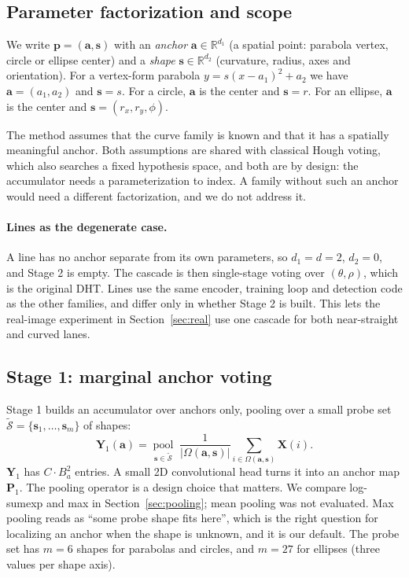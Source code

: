 \documentclass[11pt]{article}
\begin{document}
\subsection{Parameter factorization and scope}
We write $\mathbf{p}=(\mathbf{a},\mathbf{s})$ with an \emph{anchor} $\mathbf{a}\in\mathbb{R}^{d_1}$ (a spatial point: parabola vertex, circle or ellipse center) and a \emph{shape} $\mathbf{s}\in\mathbb{R}^{d_2}$ (curvature, radius, axes and orientation). For a vertex-form parabola $y=s(x-a_1)^2+a_2$ we have $\mathbf{a}=(a_1,a_2)$ and $\mathbf{s}=s$. For a circle, $\mathbf{a}$ is the center and $\mathbf{s}=r$. For an ellipse, $\mathbf{a}$ is the center and $\mathbf{s}=(r_x,r_y,\phi)$.

The method assumes that the curve family is known and that it has a spatially meaningful anchor. Both assumptions are shared with classical Hough voting, which also searches a fixed hypothesis space, and both are by design: the accumulator needs a parameterization to index. A family without such an anchor would need a different factorization, and we do not address it.

\paragraph{Lines as the degenerate case.} A line has no anchor separate from its own parameters, so $d_1=d=2$, $d_2=0$, and Stage 2 is empty. The cascade is then single-stage voting over $(\theta,\rho)$, which is the original DHT. Lines use the same encoder, training loop and detection code as the other families, and differ only in whether Stage 2 is built. This lets the real-image experiment in Section~\ref{sec:real} use one cascade for both near-straight and curved lanes.

\subsection{Stage 1: marginal anchor voting}
Stage 1 builds an accumulator over anchors only, pooling over a small probe set $\tilde{\mathcal{S}}=\{\mathbf{s}_1,\dots,\mathbf{s}_m\}$ of shapes:
\begin{equation}
\mathbf{Y}_1(\mathbf{a})=\operatorname*{pool}_{\mathbf{s}\in\tilde{\mathcal{S}}}\;\frac{1}{|\Omega(\mathbf{a},\mathbf{s})|}\sum_{i\in\Omega(\mathbf{a},\mathbf{s})}\mathbf{X}(i).
\label{eq:stage1}
\end{equation}
$\mathbf{Y}_1$ has $C\cdot B_a^{2}$ entries. A small 2D convolutional head turns it into an anchor map $\mathbf{P}_1$. The pooling operator is a design choice that matters. We compare log-sumexp and max in Section~\ref{sec:pooling}; mean pooling was not evaluated. Max pooling reads as ``some probe shape fits here'', which is the right question for localizing an anchor when the shape is unknown, and it is our default. The probe set has $m=6$ shapes for parabolas and circles, and $m=27$ for ellipses (three values per shape axis).
\end{document}
